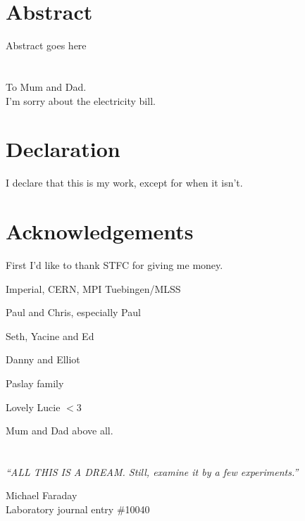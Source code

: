 

\chapter*{\centering Abstract}
Abstract goes here

\chapter*{\centering }%
\begin{center}
    \thispagestyle{empty}
    To Mum and Dad. \\
    I'm sorry about the electricity bill.
\end{center}

\chapter*{\centering Declaration}
I declare that this is my work, except for when it isn't. 

\chapter*{\centering Acknowledgements}
First I'd like to thank STFC for giving me money. 

Imperial, CERN, MPI Tuebingen/MLSS

Paul and Chris, especially Paul

Seth, Yacine and Ed

Danny and Elliot

Paslay family

Lovely Lucie $<3$

Mum and Dad above all. 



\tableofcontents
\listoffigures
\listoftables
%
\chapter*{\centering }
\begin{center}
\epigraph{\textit{``ALL THIS IS A DREAM. Still, examine it by a few experiments.''}}{Michael Faraday\\ Laboratory journal entry \#10040}
\end{center}

\cleardoublepage
